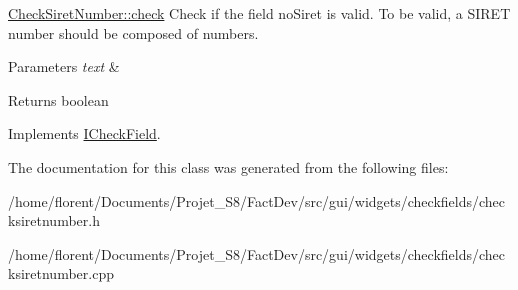 \hyperlink{classCheckSiretNumber_aaf0a1411e380789062564bd992e72c1b}{Check\-Siret\-Number\-::check} Check if the field no\-Siret is valid. To be valid, a S\-I\-R\-E\-T number should be composed of numbers. 


\begin{DoxyParams}{Parameters}
{\em text} & \\
\hline
\end{DoxyParams}
\begin{DoxyReturn}{Returns}
boolean 
\end{DoxyReturn}


Implements \hyperlink{classICheckField_a6bd42b4d49c165cdd92822135123fd4b}{I\-Check\-Field}.



The documentation for this class was generated from the following files\-:\begin{DoxyCompactItemize}
\item 
/home/florent/\-Documents/\-Projet\-\_\-\-S8/\-Fact\-Dev/src/gui/widgets/checkfields/checksiretnumber.\-h\item 
/home/florent/\-Documents/\-Projet\-\_\-\-S8/\-Fact\-Dev/src/gui/widgets/checkfields/checksiretnumber.\-cpp\end{DoxyCompactItemize}
